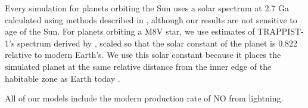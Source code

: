 Every simulation for planets orbiting the Sun uses a solar spectrum at 2.7 Ga calculated using methods described in \citet{Claire_2012}, although our results are not sensitive to age of the Sun. For planets orbiting a M8V star, we use estimates of TRAPPIST-1's spectrum derived by \citet{Lincowski_2018}, scaled so that the solar constant of the planet is 0.822 relative to modern Earth's. We use this solar constant because it places the simulated planet at the same relative distance from the inner edge of the habitable zone as Earth today \citep{Kopparapu_2013}.

All of our models include the modern production rate of NO from lightning.